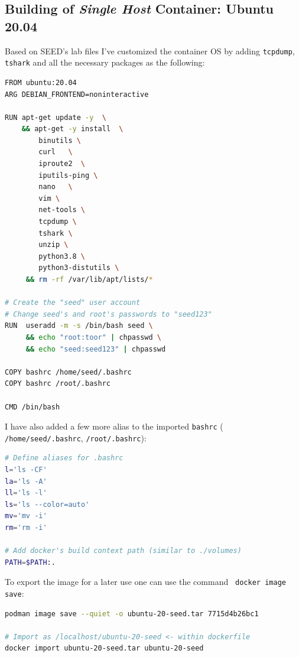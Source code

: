 \documentclass[12pt,a4paper,twocolumn]{article}
\begin{document}
\begin{appendix}
\section{Building of \textit{Single Host} Container: Ubuntu 20.04}
\label{apx:container-seed-base-setup}

Based on SEED's lab  files I've customized the container OS by adding \lstinline{tcpdump}, \lstinline{tshark} and all the necessary packages as the following:

\begin{lstlisting}[language=bash, caption=Customization of SEED Lab's Ubuntu Container Image ]
FROM ubuntu:20.04
ARG DEBIAN_FRONTEND=noninteractive

RUN apt-get update -y  \
    && apt-get -y install  \
        binutils \
        curl   \
        iproute2  \
        iputils-ping \
        nano   \
        vim \
        net-tools \
        tcpdump \
        tshark \
        unzip \
        python3.8 \
        python3-distutils \
     && rm -rf /var/lib/apt/lists/*

# Create the "seed" user account
# Change seed's and root's passwords to "seed123"
RUN  useradd -m -s /bin/bash seed \
     && echo "root:toor" | chpasswd \
     && echo "seed:seed123" | chpasswd

COPY bashrc /home/seed/.bashrc
COPY bashrc /root/.bashrc

CMD /bin/bash
\end{lstlisting}

I have also added a few more alias to the imported \lstinline{bashrc} ( \lstinline{/home/seed/.bashrc}, \lstinline{/root/.bashrc}):

\begin{lstlisting}[language=bash, caption=Customization of container images bashrc]
# Define aliases for .bashrc
l='ls -CF'
la='ls -A'
ll='ls -l'
ls='ls --color=auto'
mv='mv -i'
rm='rm -i'

# Add docker's build context path (similar to ./volumes)
PATH=$PATH:.
\end{lstlisting}

To export the image for a later use one can use the command \lstinline{ docker image save}: 

\begin{lstlisting}[language=bash, caption=Export the built Ubuntu 20.04 container image to .tar]
podman image save --quiet -o ubuntu-20-seed.tar 7715d4b26bc1

# Import as /localhost/ubuntu-20-seed <- within dockerfile
docker import ubuntu-20-seed.tar ubuntu-20-seed  


\end{lstlisting}
\end{appendix}
\end{document}

